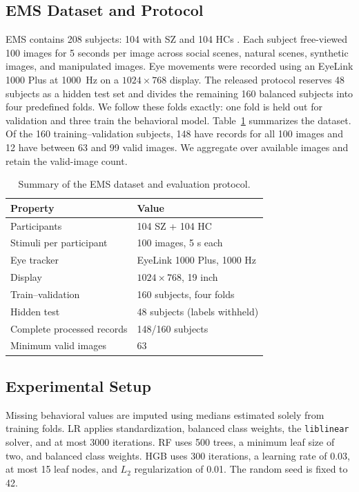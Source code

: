 \documentclass[conference,a4paper]{IEEEtran}
\begin{document}
\subsection{EMS Dataset and Protocol}
EMS contains 208 subjects: 104 with SZ and 104 HCs \cite{song2024ems}. Each subject free-viewed 100 images for 5 seconds per image across social scenes, natural scenes, synthetic images, and manipulated images. Eye movements were recorded using an EyeLink 1000 Plus at 1000~Hz on a $1024\times768$ display. The released protocol reserves 48 subjects as a hidden test set and divides the remaining 160 balanced subjects into four predefined folds. We follow these folds exactly: one fold is held out for validation and three train the behavioral model. Table~\ref{tab:dataset} summarizes the dataset. Of the 160 training--validation subjects, 148 have records for all 100 images and 12 have between 63 and 99 valid images. We aggregate over available images and retain the valid-image count.

\begin{table}[t]
\caption{Summary of the EMS dataset and evaluation protocol.}
\label{tab:dataset}
\centering
\small
\begin{tabular}{@{}ll@{}}
\toprule
Property & Value \\
\midrule
Participants & 104 SZ + 104 HC \\
Stimuli per participant & 100 images, 5 s each \\
Eye tracker & EyeLink 1000 Plus, 1000 Hz \\
Display & $1024\times768$, 19 inch \\
Train--validation & 160 subjects, four folds \\
Hidden test & 48 subjects (labels withheld) \\
Complete processed records & 148/160 subjects \\
Minimum valid images & 63 \\
\bottomrule
\end{tabular}
\end{table}

\subsection{Experimental Setup}
Missing behavioral values are imputed using medians estimated solely from training folds. LR applies standardization, balanced class weights, the \texttt{liblinear} solver, and at most 3000 iterations. RF uses 500 trees, a minimum leaf size of two, and balanced class weights. HGB uses 300 iterations, a learning rate of 0.03, at most 15 leaf nodes, and $L_2$ regularization of 0.01. The random seed is fixed to 42.
\end{document}
